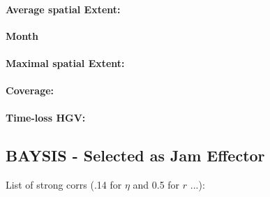 \paragraph{Average spatial Extent:}

\large
\centerline{\textbf{Month}}
\normalsize

\paragraph{Maximal spatial Extent:}
\paragraph{Coverage:}
\paragraph{Time-loss HGV:}

\subsection{BAYSIS - Selected as Jam Effector}

List of strong corrs (.14 for $\eta$ and 0.5 for $r$ ...):

